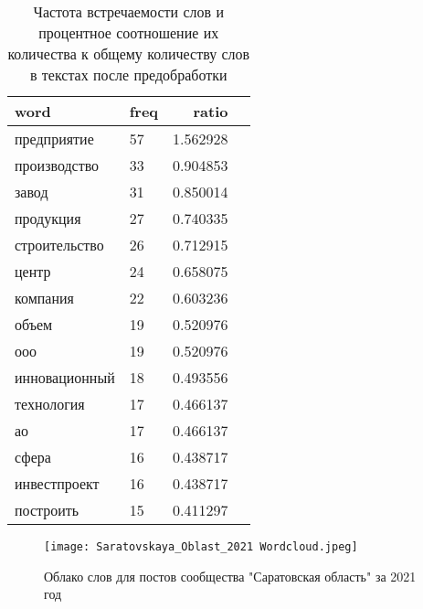 \documentclass[bachelor, och, coursework ]{SCWorks}
\begin{document}
\begin{table}[ht]
\centering
\begin{tabular}{|l|l|r|r|}
\hline
\textbf{word} & \textbf{freq} & \textbf{ratio} \\ \hline
предприятие     & 57  & 1.562928 \\ \hline
производство    & 33  & 0.904853 \\ \hline
завод           & 31  & 0.850014 \\ \hline
продукция       & 27  & 0.740335 \\ \hline
строительство   & 26  & 0.712915 \\ \hline
центр           & 24  & 0.658075 \\ \hline
компания        & 22  & 0.603236 \\ \hline
объем           & 19  & 0.520976 \\ \hline
ооо             & 19  & 0.520976 \\ \hline
инновационный   & 18  & 0.493556 \\ \hline
технология      & 17  & 0.466137 \\ \hline
ао              & 17  & 0.466137 \\ \hline
сфера           & 16  & 0.438717 \\ \hline
инвестпроект    & 16  & 0.438717 \\ \hline
построить       & 15  & 0.411297 \\ \hline
\end{tabular}
\caption{Частота встречаемости слов и процентное соотношение их количества к общему количеству слов в текстах после предобработки}
\label{tab:freq_ratio}
\end{table}

\begin{figure}[h]

\centering

\texttt{[image: Saratovskaya\_Oblast\_2021 Wordcloud.jpeg]}

\caption{Облако слов для постов сообщества "Саратовская область" за 2021 год}

\label{fig:mpr}

\end{figure}





\conclusion
\end{document}
